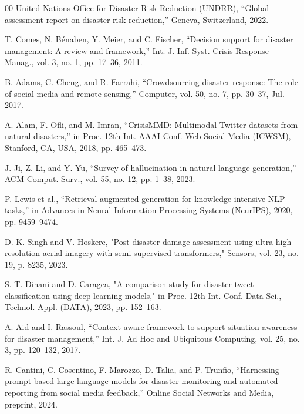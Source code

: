 \documentclass[conference]{IEEEtran}
\begin{document}

\begin{thebibliography}{00}
 United Nations Office for Disaster Risk Reduction (UNDRR), “Global assessment report on disaster risk reduction,” Geneva, Switzerland, 2022.

 T. Comes, N. Bénaben, Y. Meier, and C. Fischer, “Decision support for disaster management: A review and framework,” Int. J. Inf. Syst. Crisis Response Manag., vol. 3, no. 1, pp. 17–36, 2011.

 B. Adams, C. Cheng, and R. Farrahi, “Crowdsourcing disaster response: The role of social media and remote sensing,” Computer, vol. 50, no. 7, pp. 30–37, Jul. 2017.


 A. Alam, F. Ofli, and M. Imran, “CrisisMMD: Multimodal Twitter datasets from natural disasters,” in Proc. 12th Int. AAAI Conf. Web Social Media (ICWSM), Stanford, CA, USA, 2018, pp. 465–473.

 J. Ji, Z. Li, and Y. Yu, “Survey of hallucination in natural language generation,” ACM Comput. Surv., vol. 55, no. 12, pp. 1–38, 2023.

 P. Lewis et al., “Retrieval-augmented generation for knowledge-intensive NLP tasks,” in Advances in Neural Information Processing Systems (NeurIPS), 2020, pp. 9459–9474.

 D. K. Singh and V. Hoskere, "Post disaster damage assessment using ultra-high-resolution aerial imagery with semi-supervised transformers," Sensors, vol. 23, no. 19, p. 8235, 2023.

 S. T. Dinani and D. Caragea, "A comparison study for disaster tweet classification using deep learning models," in Proc. 12th Int. Conf. Data Sci., Technol. Appl. (DATA), 2023, pp. 152–163.

 A. Aid and I. Rassoul, “Context-aware framework to support situation-awareness for disaster management,” Int. J. Ad Hoc and Ubiquitous Computing, vol. 25, no. 3, pp. 120–132, 2017.

 R. Cantini, C. Cosentino, F. Marozzo, D. Talia, and P. Trunfio, “Harnessing prompt-based large language models for disaster monitoring and automated reporting from social media feedback,” Online Social Networks and Media, preprint, 2024.


\end{thebibliography}
\end{document}
